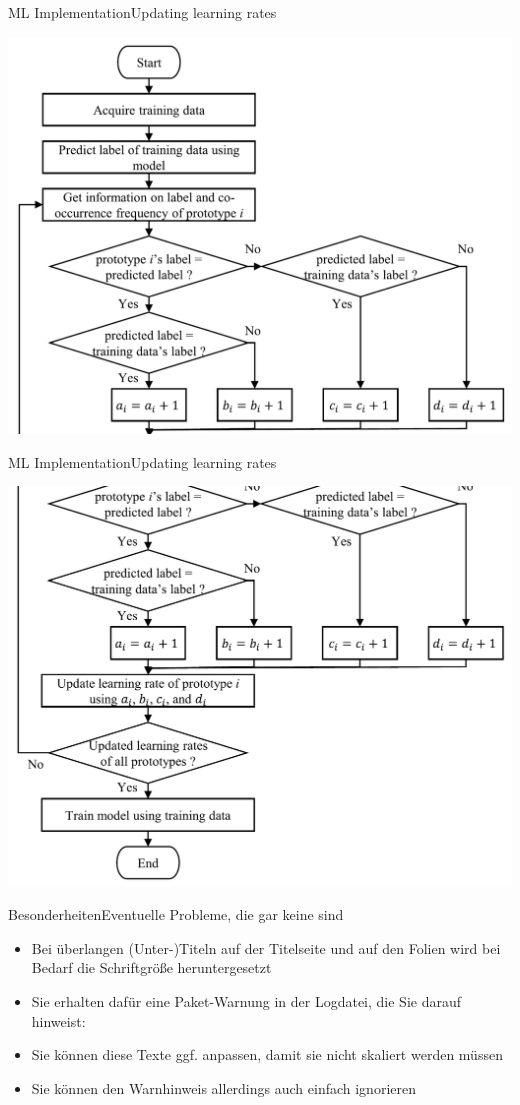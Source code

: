 \documentclass[
	aspectratio=169,	%
	onlytextwidth,		%
	t,					%
	]{beamer}
\begin{document}
	\begin{frame}[fragile]{ML Implementation}{Updating learning rates}
	
		\centering
				\includegraphics[width=.4\textwidth]{myfigs/lr flowchart1.png}
	\end{frame}

	\begin{frame}[fragile]{ML Implementation}{Updating learning rates}
	
		\centering
				\includegraphics[width=.4\textwidth]{myfigs/lr flowchart2.png}
	\end{frame}

	
	\begin{frame}{Besonderheiten}{Eventuelle Probleme, die gar keine sind}
		\begin{itemize}
			\item Bei überlangen (Unter-)Titeln auf der Titelseite und auf den Folien wird bei Bedarf die Schriftgröße heruntergesetzt
			\item Sie erhalten dafür eine Paket-Warnung in der Logdatei, die Sie darauf hinweist:
			\newline
			\item Sie können diese Texte ggf. anpassen, damit sie nicht skaliert werden müssen
			\item Sie können den Warnhinweis allerdings auch einfach ignorieren
		\end{itemize}
	\end{frame}
\end{document}
